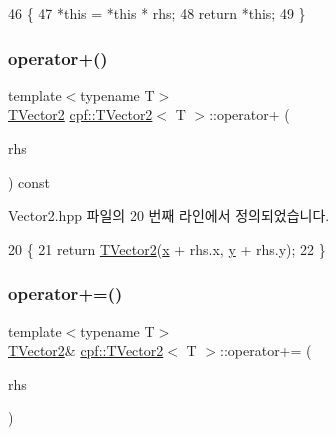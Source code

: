 \begin{DoxyCode}
46                                                   \{
47             *\textcolor{keyword}{this} = *\textcolor{keyword}{this} * rhs;
48             \textcolor{keywordflow}{return} *\textcolor{keyword}{this};
49         \}
\end{DoxyCode}
\mbox{\label{classcpf_1_1_t_vector2_a46e25d7c045977e31686fd39b5ea2dcc}} 
\subsubsection{\texorpdfstring{operator+()}{operator+()}}
{\footnotesize\ttfamily template$<$typename T$>$ \\
\hyperlink{classcpf_1_1_t_vector2}{T\+Vector2} \hyperlink{classcpf_1_1_t_vector2}{cpf\+::\+T\+Vector2}$<$ T $>$\+::operator+ (\begin{DoxyParamCaption}\item[{const \hyperlink{classcpf_1_1_t_vector2}{T\+Vector2}$<$ T $>$ \&}]{rhs }\end{DoxyParamCaption}) const\hspace{0.3cm}{\ttfamily [inline]}}



Vector2.\+hpp 파일의 20 번째 라인에서 정의되었습니다.


\begin{DoxyCode}
20                                                       \{
21             \textcolor{keywordflow}{return} \hyperlink{classcpf_1_1_t_vector2_aaed071ed32aa0e7fb5d8dc15e65aa2e5}{TVector2}(\hyperlink{classcpf_1_1_t_vector2_a2c0ac9258353351f1435070a2307e9e1}{x} + rhs.x, \hyperlink{classcpf_1_1_t_vector2_a727b923b39a876bbb13c810bcf6eecff}{y} + rhs.y);
22         \}
\end{DoxyCode}
\mbox{\label{classcpf_1_1_t_vector2_aab38c633df2681dd730d03ba1847baba}} 
\subsubsection{\texorpdfstring{operator+=()}{operator+=()}}
{\footnotesize\ttfamily template$<$typename T$>$ \\
\hyperlink{classcpf_1_1_t_vector2}{T\+Vector2}\& \hyperlink{classcpf_1_1_t_vector2}{cpf\+::\+T\+Vector2}$<$ T $>$\+::operator+= (\begin{DoxyParamCaption}\item[{const \hyperlink{classcpf_1_1_t_vector2}{T\+Vector2}$<$ T $>$ \&}]{rhs }\end{DoxyParamCaption})\hspace{0.3cm}{\ttfamily [inline]}}



